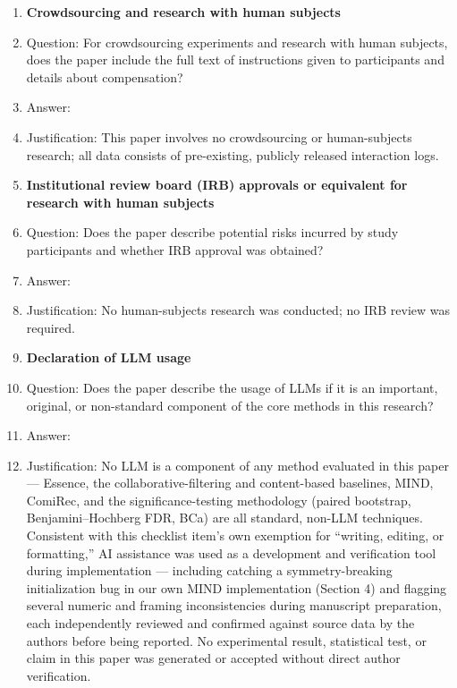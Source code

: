 \documentclass{article}
\begin{document}
\begin{enumerate}
\item {\bf Crowdsourcing and research with human subjects}
    \item[] Question: For crowdsourcing experiments and research with human subjects, does the paper include the full text of instructions given to participants and details about compensation?
    \item[] Answer: \answerNA{}
    \item[] Justification: This paper involves no crowdsourcing or human-subjects research; all data consists of pre-existing, publicly released interaction logs.

\item {\bf Institutional review board (IRB) approvals or equivalent for research with human subjects}
    \item[] Question: Does the paper describe potential risks incurred by study participants and whether IRB approval was obtained?
    \item[] Answer: \answerNA{}
    \item[] Justification: No human-subjects research was conducted; no IRB review was required.

\item {\bf Declaration of LLM usage}
    \item[] Question: Does the paper describe the usage of LLMs if it is an important, original, or non-standard component of the core methods in this research?
    \item[] Answer: \answerYes{}
    \item[] Justification: No LLM is a component of any method evaluated in this paper --- Essence, the collaborative-filtering and content-based baselines, MIND, ComiRec, and the significance-testing methodology (paired bootstrap, Benjamini--Hochberg FDR, BCa) are all standard, non-LLM techniques. Consistent with this checklist item's own exemption for ``writing, editing, or formatting,'' AI assistance was used as a development and verification tool during implementation --- including catching a symmetry-breaking initialization bug in our own MIND implementation (Section 4) and flagging several numeric and framing inconsistencies during manuscript preparation, each independently reviewed and confirmed against source data by the authors before being reported. No experimental result, statistical test, or claim in this paper was generated or accepted without direct author verification.

\end{enumerate}
\end{document}
